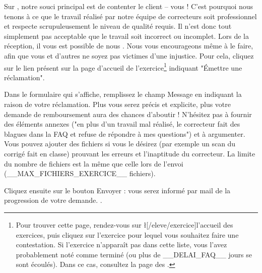﻿Sur \eDevoir, notre souci principal est de contenter le client -- vous ! C'est pourquoi nous tenons à ce que le travail réalisé par notre équipe de correcteurs soit professionnel et respecte scrupuleusement le niveau de qualité requis. Il n'est donc tout simplement pas acceptable que le travail soit incorrect ou incomplet. Lors de la réception, il vous est possible de nous . Nous vous encourageons même à le faire, afin que vous et d'autres ne soyez pas victimes d'une injustice.
Pour cela, cliquez sur le lien présent sur la page d'accueil de l'exercice\footnote{Pour trouver cette page, rendez-vous sur \l[/eleve/exercice]{l'accueil des exercices}, puis cliquez sur l'exercice pour lequel vous souhaitez faire une contestation. Si l'exercice n'apparaît pas dans cette liste, vous l'avez probablement noté comme terminé (ou plus de __DELAI_FAQ__ jours se sont écoulés). Dans ce cas, consultez la page des .} indiquant "Émettre une réclamation".

Dans le formulaire qui s'affiche, remplissez le champ Message en indiquant la raison de votre réclamation. Plus vous serez précis et explicite, plus votre demande de remboursement aura des chances d'aboutir ! N'hésitez pas à fournir des éléments annexes ("en plus d'un travail mal réalisé, le correcteur fait des blagues dans la FAQ et refuse de répondre à mes questions") et à argumenter.
Vous pouvez ajouter des fichiers si vous le désirez (par exemple un scan du corrigé fait en classe) prouvant les erreurs et l'inaptitude du correcteur. La limite du nombre de fichiers est la même que celle lors de l'envoi (__MAX_FICHIERS_EXERCICE__ fichiers).

Cliquez ensuite sur le bouton Envoyer : vous serez informé par mail de la progression de votre demande. .